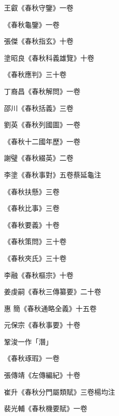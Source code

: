 \begin{pinyinscope}
 王叡《春秋守鑒》一卷



 《春秋龜鑒》一卷



 張傑《春秋指玄》十卷



 塗昭良《春秋科義雄覽》十卷



 《春秋應判》三十卷



 丁裔昌《春秋解問》一卷



 邵川《春秋括義》三卷



 劉英《春秋列國圖》一卷



 《春秋十二國年歷》一卷



 謝璧《春秋綴英》二卷



 李塗《春秋事對》五卷蔡延龜注



 《春秋扶懸》三卷



 《春秋比事》三卷



 《春秋要義》十卷



 《春秋策問》三十卷



 《春秋夾氏》三十卷



 李融《春秋樞宗》十卷



 姜虔嗣《春秋三傳纂要》二十卷



 惠
 簡《春秋通略全義》十五卷



 元保宗《春秋事要》十卷



 鞏浚一作「潛」



 《春秋琢瑕》一卷



 張傳靖《左傳編紀》十卷



 崔升《春秋分門屬類賦》三卷楊均注



 裴光輔《春秋機要賦》一卷




\end{pinyinscope}
